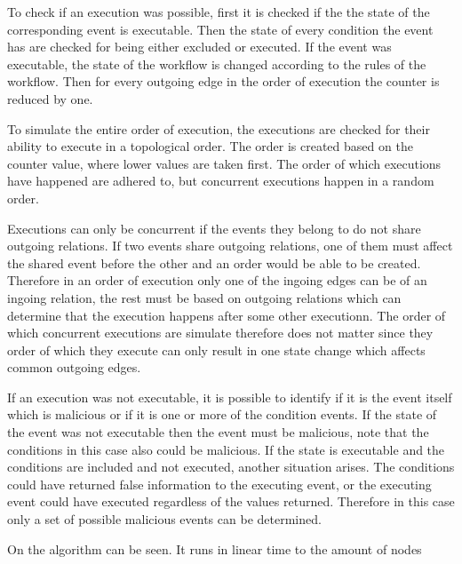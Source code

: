     \newpar To check if an execution was possible, first it is checked if the the state of the corresponding event is executable. Then the state of every condition the event has are checked for being either excluded or executed. If the event was executable, the state of the workflow is changed according to the rules of the workflow. Then for every outgoing edge in the order of execution the counter is reduced by one. 
    
    \newpar To simulate the entire order of execution, the executions are checked for their ability to execute in a topological order. The order is created based on the counter value, where lower values are taken first. The order of which executions have happened are adhered to, but concurrent executions happen in a random order.
    
    Executions can only be concurrent if the events they belong to do not share outgoing relations. If two events share outgoing relations, one of them must affect the shared event before the other and an order would be able to be created. Therefore in an order of execution only one of the ingoing edges can be of an ingoing relation, the rest must be based on outgoing relations which can determine that the execution happens after some other executionn. The order of which concurrent executions are simulate therefore does not matter since they order of which they execute can only result in one state change which affects common outgoing edges.
    
    \newpar If an execution was not executable, it is possible to identify if it is the event itself which is malicious or if it is one or more of the condition events. If the state of the event was not executable then the event must be malicious, note that the conditions in this case also could be malicious. If the state is executable and the conditions are included and not executed, another situation arises. The conditions could have returned false information to the executing event, or the executing event could have executed regardless of the values returned. Therefore in this case only a set of possible malicious events can be determined.

	\newpar On  the algorithm can be seen. It runs in linear time to the amount of nodes
	
